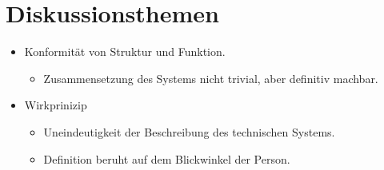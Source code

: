 \documentclass[11pt,a4paper]{article}
\begin{document}
\section{Diskussionsthemen}
\begin{itemize}
\item Konformität von Struktur und Funktion.
\begin{itemize}
\item Zusammensetzung des Systems nicht trivial, aber definitiv machbar.
\end{itemize}
\item Wirkprinizip
\begin{itemize}
\item Uneindeutigkeit der Beschreibung des technischen Systems.
\item Definition beruht auf dem Blickwinkel der Person.
\end{itemize}
\end{itemize}
\end{document}
